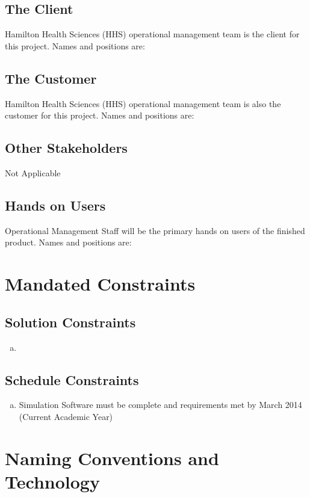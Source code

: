\documentclass[paper=letter, fontsize=10pt]{scrartcl}
\numberwithin{equation}{section}		%
\numberwithin{figure}{section}			%
\numberwithin{table}{section}				%
\begin{document}
\subsection{The Client}
Hamilton Health Sciences (HHS) operational management team is the client for this project. Names and positions are:
\subsection{The Customer}
Hamilton Health Sciences (HHS) operational management team is also the customer for this project. Names and positions are:
\subsection{Other Stakeholders}
Not Applicable
\subsection{Hands on Users}
Operational Management Staff will be the primary hands on users of the finished product. Names and positions are:

\section{Mandated Constraints}

\subsection{Solution Constraints}
\begin{enumerate}[(a)]
	\item 
\end{enumerate}
\subsection{Schedule Constraints}
\begin{enumerate}[(a)]
	\item Simulation Software must be complete and requirements met by March 2014 (Current Academic Year)  
\end{enumerate}

\section{Naming Conventions and Technology}
\end{document}
